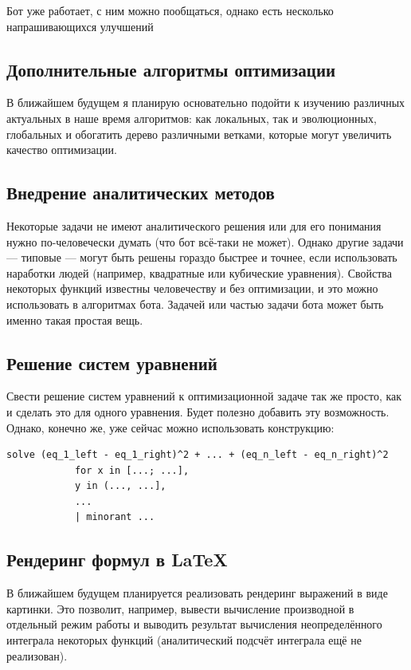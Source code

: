\documentclass[11pt]{article}
\begin{document}
    Бот уже работает, с ним можно пообщаться, однако есть несколько напрашивающихся улучшений

    \subsection{Дополнительные алгоритмы оптимизации}
    В ближайшем будущем я планирую основательно подойти к изучению различных актуальных в наше время алгоритмов:
    как локальных, так и эволюционных, глобальных и обогатить дерево различными ветками, которые могут увеличить качество оптимизации.

    \subsection{Внедрение аналитических методов}
    Некоторые задачи не имеют аналитического решения или для его понимания нужно по-человечески думать (что бот всё-таки не может).
    Однако другие задачи — типовые — могут быть решены гораздо быстрее и точнее, если использовать наработки людей (например, квадратные или кубические уравнения).
    Свойства некоторых функций известны человечеству и без оптимизации, и это можно использовать в алгоритмах бота.
    Задачей или частью задачи бота может быть именно такая простая вещь.

    \subsection{Решение систем уравнений}
    Свести решение систем уравнений к оптимизационной задаче так же просто, как и сделать это для одного уравнения.
    Будет полезно добавить эту возможность.
    Однако, конечно же, уже сейчас можно использовать конструкцию:

    \begin{lstlisting}[label={lst:equation-system}]
            solve (eq_1_left - eq_1_right)^2 + ... + (eq_n_left - eq_n_right)^2
            for x in [...; ...],
            y in (..., ...],
            ...
            | minorant ...
    \end{lstlisting}

    \subsection{Рендеринг формул в \LaTeX}
    В ближайшем будущем планируется реализовать рендеринг выражений в виде картинки.
    Это позволит, например, вывести вычисление производной в отдельный режим работы
    и выводить результат вычисления неопределённого интеграла некоторых функций (аналитический подсчёт интеграла ещё не реализован).
\end{document}
